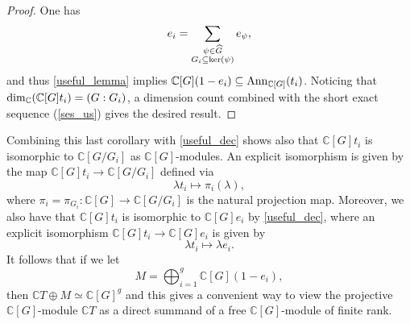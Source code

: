 \documentclass[11pt]{amsart}
\numberwithin{equation}{section}
\theoremstyle{remark}
\theoremstyle{definition}
\begin{document}
\begin{proof}
One has
$$e_{i} = \sum_{\substack{\psi \in \widehat{G} \\ G_{i} \subseteq {\rm ker}(\psi)}}e_{\psi}, $$
and thus \cref{useful_lemma} implies $\mathbb{C}[G](1-e_{i}) \subseteq {\rm Ann}_{\mathbb{C}[G]}(t_{i})$.  Noticing that ${\rm dim}_{\mathbb{C}}(\mathbb{C}[G]t_{i}) = (G:G_{i})$, a dimension count combined with the short exact sequence (\ref{ses_us}) gives the desired result.
\end{proof}
Combining this last corollary with \cref{useful_dec} shows also that $\mathbb{C}[G]t_{i}$ is isomorphic to $\mathbb{C}[G/G_{i}]$ as $\mathbb{C}[G]$-modules.  An explicit isomorphism is given by the map $\mathbb{C}[G]t_{i} \rightarrow \mathbb{C}[G/G_{i}]$ defined via
$$\lambda t_{i} \mapsto \pi_{i}(\lambda), $$
where $\pi_{i} = \pi_{G_{i}}:\mathbb{C}[G] \rightarrow \mathbb{C}[G/G_{i}]$ is the natural projection map.  Moreover, we also have that $\mathbb{C}[G]t_{i}$ is isomorphic to $\mathbb{C}[G]e_{i}$ by \cref{useful_dec}, where an explicit isomorphism $\mathbb{C}[G]t_{i} \rightarrow \mathbb{C}[G]e_{i} $ is given by
\begin{equation} \label{iso_u}
\lambda t_{i} \mapsto \lambda e_{i}. 
\end{equation}
It follows that if we let 
\begin{equation} \label{useful_sup}
M = \bigoplus_{i=1}^{g}\mathbb{C}[G](1-e_{i}),
\end{equation}
then $\mathbb{C}T \oplus M \simeq \mathbb{C}[G]^{g}$ and this gives a convenient way to view the projective $\mathbb{C}[G]$-module $\mathbb{C}T$ as a direct summand of a free $\mathbb{C}[G]$-module of finite rank.
\end{document}
